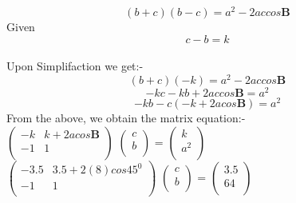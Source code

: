 \documentclass[10pt,a4paper]{report}
\let\vec\mathbf
\begin{document}
\begin{multicols}{2}
\begin{equation}
(b+c)(b-c) = {a}^2- 2accos\vec{B}
\end{equation}
Given
\begin{equation}
        c-b=k
\end{equation}\\
Upon Simplifaction we get:- \\
\begin{equation}
  (b+c)(-k) = {a}^2- 2accos\vec{B} 
\end{equation}
\begin{equation}
-kc-kb+2accos\vec{B}= {a}^2
\end{equation}
\begin{equation}
-kb-c(-k+2acos\vec{B})= {a}^2
\end{equation}
     From the above, we obtain the matrix equation:- \\ \vspace{3mm}
        $\begin{pmatrix}
            -k & k+2acos\vec{B}  \\
            -1 & 1  \\
        \end{pmatrix}$%
        $\begin{pmatrix}
            c \\
            b \\
        \end{pmatrix}$%
           =
           $\begin{pmatrix}
            k\\
            a^2\\
        \end{pmatrix}$%
        \vspace{5mm}           
   \\  
    $\begin{pmatrix}
            -3.5 & 3.5+2(8)cos45^0 \\
            -1 & 1  \\
        \end{pmatrix}$%
        $\begin{pmatrix}
            c \\
            b \\
        \end{pmatrix}$%
           =
           $\begin{pmatrix}
            3.5\\
            64\\
        \end{pmatrix}$%
        \vspace{5mm}           

\end{multicols}
\end{document}
